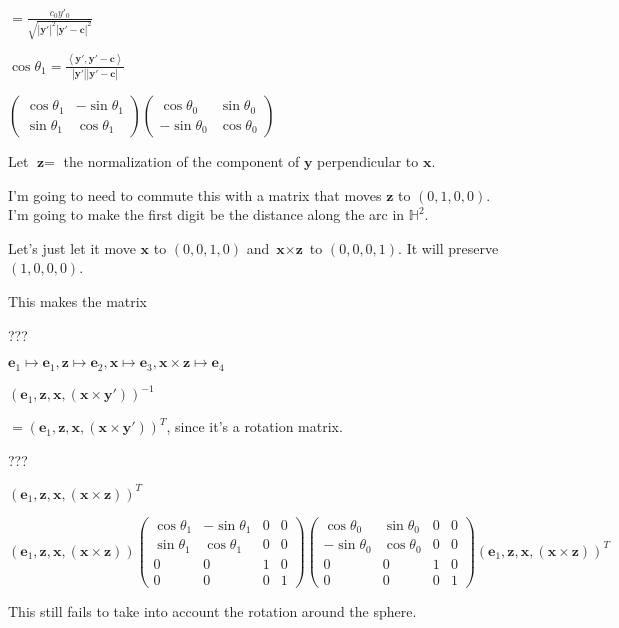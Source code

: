 \documentclass[12pt]{amsart}
\newcommand{\mat}[4]{\left(\begin{array}{ccc} #1 & #2 \\#3 & #4 \end{array} \right)}
\begin{document}
$= \frac{c_0 y'_0}{\sqrt{|\textbf{y}'|^2|\textbf{y}'-\textbf{c}|^2}}$

$\cos\theta_1 = \frac{\left<\textbf{y}',\textbf{y}'-\textbf{c}\right>}{|\textbf{y}'||\textbf{y}'-\textbf{c}|}$

$\mat{\cos\theta_1}{-\sin\theta_1}{\sin\theta_1}{\cos\theta_1}\mat{\cos\theta_0}{\sin\theta_0}{-\sin\theta_0}{\cos\theta_0}$

Let $\textbf{z} =$ the normalization of the component of $\textbf{y}$ perpendicular to $\textbf{x}$.

I'm going to need to commute this with a matrix that moves $\textbf{z}$ to $(0,1,0,0)$. I'm going to make the first digit be the distance along the arc in $\mathbb{H}^2$.

Let's just let it move $\textbf{x}$ to $(0,0,1,0)$ and $\textbf{x} \times \textbf{z}$ to $(0,0,0,1)$. It will preserve $(1,0,0,0)$.

This makes the matrix

???

$\textbf{e}_1 \mapsto \textbf{e}_1, \textbf{z} \mapsto \textbf{e}_2, \textbf{x} \mapsto \textbf{e}_3, \textbf{x} \times \textbf{z} \mapsto \textbf{e}_4$

$(\textbf{e}_1, \textbf{z},\textbf{x},(\textbf{x} \times \textbf{y}'))^{-1}$

$= (\textbf{e}_1, \textbf{z},\textbf{x},(\textbf{x} \times \textbf{y}'))^T$, since it's a rotation matrix.

???

$(\textbf{e}_1,\textbf{z},\textbf{x},(\textbf{x} \times \textbf{z}))^T$

$$(\textbf{e}_1,\textbf{z},\textbf{x},(\textbf{x} \times \textbf{z}))
\left(\begin{array}{cccc} \cos\theta_1 & -\sin\theta_1 & 0 & 0 \\ \sin\theta_1 & \cos\theta_1 & 0 & 0 \\ 0 & 0 & 1 & 0 \\ 0 & 0 & 0 & 1 \end{array} \right)
\left(\begin{array}{cccc} \cos\theta_0 & \sin\theta_0 & 0 & 0 \\ -\sin\theta_0 & \cos\theta_0 & 0 & 0 \\ 0 & 0 & 1 & 0 \\ 0 & 0 & 0 & 1 \end{array} \right)
(\textbf{e}_1,\textbf{z},\textbf{x},(\textbf{x} \times \textbf{z}))^T$$

This still fails to take into account the rotation around the sphere.
\end{document}
